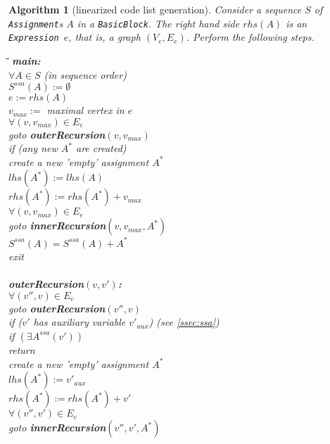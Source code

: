 \documentclass{book}
\newcommand{\Assignment}{{\tt Assignment}}
\newcommand{\BasicBlock}{{\tt BasicBlock}}
\newcommand{\Expression}{{\tt Expression}}
\newtheorem{Alg}{Algorithm}
\begin{document}
\begin{Alg}[linearized code list generation]
Consider a sequence $S$ of {\Assignment}s $A$ in a \BasicBlock. 
The right hand side $rhs(A)$ is an \Expression\ $e$, that is, a graph
$(V_e,E_e)$.
Perform the following steps.
\begin{tabbing}
\hspace*{3ex}\=\hspace*{3ex}\=\hspace*{3ex}\=\hspace*{3ex}\=\hspace*{-13ex}
{\bf main:}\\
\>$\forall  A \in S $ (in sequence order) \\
\>\> $S^{ssa}(A):=\emptyset$ \\
\>\> $e:=rhs(A)$ \\
\>\> $v_{max}:=$ maximal vertex in $e$ \\ 
\>\> $\forall (v,v_{max})\in E_e$ \\
\>\> goto {\bf outerRecursion}$(v,v_{max})$ \\ 
\>\> if (any new $A^*$ are created) \\ 
\>\>\> create a new 'empty' assignment $A^*$\\
\>\>\> $lhs(A^*):=lhs(A)$\\
\>\>\> $rhs(A^*):=rhs(A^*)+v_{max}$\\
\>\>\> $\forall (v,v_{max})\in E_e$ \\
\>\>\>\> goto {\bf innerRecursion}$(v,v_{max},A^*)$ \\ 
\>\>\> $S^{ssa}(A)=S^{ssa}(A)+A^*$ \\
\>exit\\
\\
{\bf outerRecursion$(v,v')$:}\\
\> $\forall (v'',v)\in E_e$ \\
\>\> goto {\bf outerRecursion}$(v'',v)$ \\ 
\> if ($v'$ has auxiliary variable $v'_{aux}$) (see \ref{ssec:ssa}) \\
\>\> if $(\exists A^{ssa}(v'))$\\
\>\>\> return\\
\>\> create a new 'empty' assignment $A^*$\\
\>\> $lhs(A^*):=v'_{aux}$\\
\>\> $rhs(A^*):=rhs(A^*)+v'$\\
\>\> $\forall (v'',v')\in E_e$ \\
\>\>\> goto {\bf innerRecursion}$(v'',v',A^*)$ \\ 

\end{tabbing}
\end{Alg}
\end{document}
